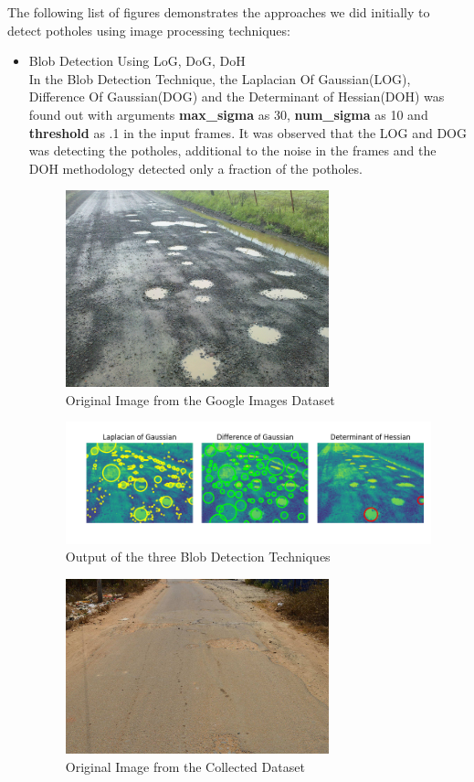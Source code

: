 \documentclass[12pt,a4paper]{article}
\begin{document}
The following list of figures demonstrates the approaches we did initially to detect potholes using image processing techniques:

\begin{itemize}
\item Blob Detection Using LoG, DoG, DoH \\

In the Blob Detection Technique, the Laplacian Of Gaussian(LOG), Difference Of Gaussian(DOG) and the Determinant of Hessian(DOH) was found out with arguments \textbf{max\_sigma} as 30, \textbf{num\_sigma} as 10 and \textbf{threshold} as .1 in the input frames. It was observed that the LOG and DOG was detecting the potholes, additional to the noise in the frames and the DOH methodology detected only a fraction of the potholes.

    
    \begin{figure}[ht!]
        \centering
        \includegraphics[width = 3in]{images/road_11.jpg}
        \caption{Original Image from the Google Images Dataset}
    \end{figure}

    \begin{figure}[ht!]
        \centering
        \includegraphics[width = 6in]{images/blob_3.png}
        \caption{Output of the three Blob Detection Techniques}
    \end{figure}
    
    \pagebreak
    
    \begin{figure}[ht!]
        \centering
        \includegraphics[width = 3in]{images/road_cam_8.jpg}
        \caption{Original Image from the Collected Dataset}
    \end{figure}
    

\end{itemize}
\end{document}
